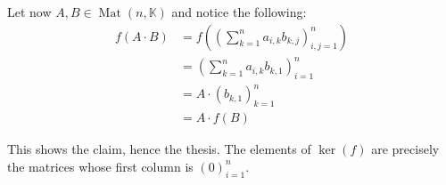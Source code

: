 \documentclass{article}
\newcommand{\numberset}{\mathbb}
\newcommand{\K}{\numberset{K}}
\DeclareMathOperator{\Mat}{Mat}
\begin{document}
Let now $A,B\in\Mat(n,\K)$ and notice the following:
\begin{align*}
    f(A\cdot B) &=f\left(\left(\sum_{k=1}^n a_{i,k}b_{k,j}\right)_{i,j=1}^n\right) \\
    &=\left(\sum_{k=1}^n a_{i,k}b_{k,1}\right)_{i=1}^n \\
    &=A\cdot (b_{k,1})_{k=1}^n \\
    &=A\cdot f(B)
\end{align*}

This shows the claim, hence the thesis. The elements of $\ker(f)$ are precisely 
the matrices whose first column is $(0)_{i=1}^n$.

\printbibliography
\end{document}
